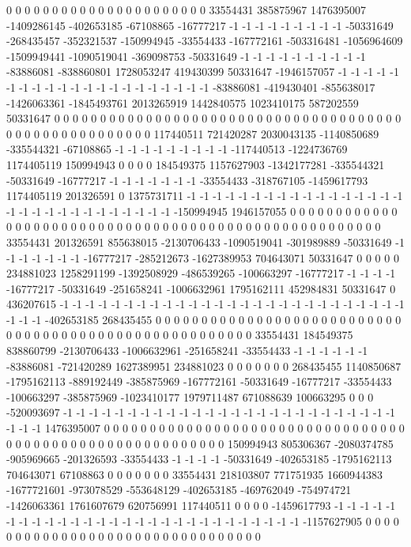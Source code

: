 0 0 0 0 0 0 0 0 0 0 0 0 0 0 0 0 0 0 0 0 0 0 33554431 385875967 1476395007 -1409286145 -402653185 -67108865 -16777217 -1 -1 -1 -1 -1 -1 -1 -1 -1 -50331649 -268435457 -352321537 -150994945 -33554433 -167772161 -503316481 -1056964609 -1509949441 -1090519041 -369098753 -50331649 -1 -1 -1 -1 -1 -1 -1 -1 -1 -1 -83886081 -838860801 1728053247 419430399 50331647 -1946157057 -1 -1 -1 -1 -1 -1 -1 -1 -1 -1 -1 -1 -1 -1 -1 -1 -1 -1 -1 -1 -1 -83886081 -419430401 -855638017 -1426063361 -1845493761 2013265919 1442840575 1023410175 587202559 50331647 0 0 0 0 0 0 0 0 0 0 0 0 0 0 0 0 0 0 0 0 0 0 0 0 0 0 0 0 0 0 0
0 0 0 0 0 0 0 0 0 0 0 0 0 0 0 0 0 0 0 0 0 0 0 117440511 721420287 2030043135 -1140850689 -335544321 -67108865 -1 -1 -1 -1 -1 -1 -1 -1 -1 -117440513 -1224736769 1174405119 150994943 0 0 0 0 184549375 1157627903 -1342177281 -335544321 -50331649 -16777217 -1 -1 -1 -1 -1 -1 -1 -33554433 -318767105 -1459617793 1174405119 201326591 0 1375731711 -1 -1 -1 -1 -1 -1 -1 -1 -1 -1 -1 -1 -1 -1 -1 -1 -1 -1 -1 -1 -1 -1 -1 -1 -1 -1 -1 -1 -1 -1 -150994945 1946157055 0 0 0 0 0 0 0 0 0 0 0 0 0 0 0 0 0 0 0 0 0 0 0 0 0 0 0 0 0 0
0 0 0 0 0 0 0 0 0 0 0 0 0 0 0 0 0 0 0 0 0 0 0 33554431 201326591 855638015 -2130706433 -1090519041 -301989889 -50331649 -1 -1 -1 -1 -1 -1 -1 -16777217 -285212673 -1627389953 704643071 50331647 0 0 0 0 0 234881023 1258291199 -1392508929 -486539265 -100663297 -16777217 -1 -1 -1 -1 -16777217 -50331649 -251658241 -1006632961 1795162111 452984831 50331647 0 436207615 -1 -1 -1 -1 -1 -1 -1 -1 -1 -1 -1 -1 -1 -1 -1 -1 -1 -1 -1 -1 -1 -1 -1 -1 -1 -1 -1 -1 -1 -1 -402653185 268435455 0 0 0 0 0 0 0 0 0 0 0 0 0 0 0 0 0 0 0 0 0 0 0 0 0 0 0 0 0 0
0 0 0 0 0 0 0 0 0 0 0 0 0 0 0 0 0 0 0 0 0 0 0 0 33554431 184549375 838860799 -2130706433 -1006632961 -251658241 -33554433 -1 -1 -1 -1 -1 -1 -83886081 -721420289 1627389951 234881023 0 0 0 0 0 0 0 268435455 1140850687 -1795162113 -889192449 -385875969 -167772161 -50331649 -16777217 -33554433 -100663297 -385875969 -1023410177 1979711487 671088639 100663295 0 0 0 -520093697 -1 -1 -1 -1 -1 -1 -1 -1 -1 -1 -1 -1 -1 -1 -1 -1 -1 -1 -1 -1 -1 -1 -1 -1 -1 -1 -1 -1 -1 1476395007 0 0 0 0 0 0 0 0 0 0 0 0 0 0 0 0 0 0 0 0 0 0 0 0 0 0 0 0 0 0 0
0 0 0 0 0 0 0 0 0 0 0 0 0 0 0 0 0 0 0 0 0 0 0 0 0 0 150994943 805306367 -2080374785 -905969665 -201326593 -33554433 -1 -1 -1 -1 -50331649 -402653185 -1795162113 704643071 67108863 0 0 0 0 0 0 0 33554431 218103807 771751935 1660944383 -1677721601 -973078529 -553648129 -402653185 -469762049 -754974721 -1426063361 1761607679 620756991 117440511 0 0 0 0 -1459617793 -1 -1 -1 -1 -1 -1 -1 -1 -1 -1 -1 -1 -1 -1 -1 -1 -1 -1 -1 -1 -1 -1 -1 -1 -1 -1 -1 -1 -1157627905 0 0 0 0 0 0 0 0 0 0 0 0 0 0 0 0 0 0 0 0 0 0 0 0 0 0 0 0 0 0 0 0

